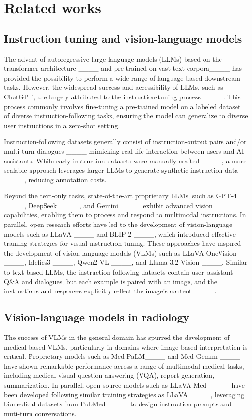 \section{Related works}
\subsection{Instruction tuning and vision-language models}

The advent of autoregressive large language models (LLMs) based on the transformer architecture ____ and pre-trained on vast text corpora____ has provided the possibility to perform a wide range of language-based downstream tasks. However, the widespread success and accessibility of LLMs, such as ChatGPT, are largely attributed to the instruction-tuning process ____. This process commonly involves fine-tuning a pre-trained model on a labeled dataset of diverse instruction-following tasks, ensuring the model can generalize to diverse user instructions in a zero-shot setting. 

Instruction-following datasets generally consist of instruction-output pairs and/or multi-turn dialogues ____ mimicking real-life interaction between users and AI assistants. While early instruction datasets were manually crafted ____, a more scalable approach leverages larger LLMs to generate synthetic instruction data ____, reducing annotation costs. 

Beyond the text-only tasks, state-of-the-art proprietary LLMs, such as GPT-4 ____, DeepSeek ____, and Gemini ____ exhibit advanced vision capabilities, enabling them to process and respond to multimodal instructions. In parallel, open research efforts have led to the development of vision-language models such as LLaVA ____ and BLIP-2 ____, which introduced effective training strategies for visual instruction tuning. These approaches have inspired the development of vision-language models (VLMs) such as LLaVA-OneVision ____, Idefics3 ____, Qwen2-VL ____, and Llama-3.2 Vision ____. Similar to text-based LLMs, the instruction-following datasets contain user–assistant Q\&A and dialogues, but each example is paired with an image, and the instructions and responses explicitly reflect the image's content ____. 


\subsection{Vision-language models in radiology}

 The success of VLMs in the general domain has spurred the development of medical-based VLMs, particularly in domains where image-based interpretation is critical. Proprietary models such as Med-PaLM____ and Med-Gemini ____ have shown remarkable performance across a range of multimodal medical tasks, including medical visual question answering (VQA), report generation, summarization. In parallel, open source models such as LLaVA-Med ____ have been developed following similar training strategies as LLaVA ____, leveraging biomedical datasets from PubMed ____ to design instruction prompts and muti-turn conversations. 

